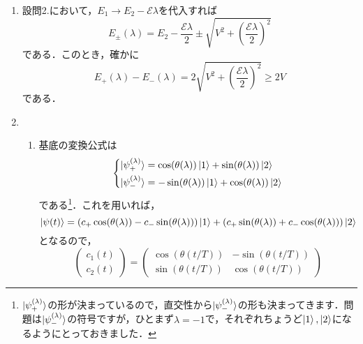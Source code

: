 \documentclass[a4paper,pdflatex,ja=standard]{bxjsarticle}
\begin{document}
\begin{enumerate}
  \item 
  設問2.において，$E_{1}\rightarrow E_{2}-\mathcal{E}\lambda$を代入すれば
  \begin{equation}
    E_{\pm}(\lambda)
    =
    E_{2}-\frac{\mathcal{E}\lambda}{2}
    \pm
    \sqrt{V^2+\left( \frac{\mathcal{E}\lambda}{2} \right)^2}
  \end{equation}
  である．このとき，確かに
  \begin{equation}
    E_{+}(\lambda)
    -
    E_{-}(\lambda)
    =
    2\sqrt{V^2+\left( \frac{\mathcal{E}\lambda}{2} \right)^2}
    \geq
    2V
  \end{equation}
  である．

  \item 
  \begin{enumerate}
    \item 
    基底の変換公式は
    \begin{equation}
      \left\{
        \begin{alignedat}{1}
          \ket{\psi_{+}^{(\lambda)}}
          &=
          \cos(\theta(\lambda))
          \ket{1}
          +
          \sin(\theta(\lambda))
          \ket{2}
          \\
          \ket{\psi_{-}^{(\lambda)}}
          &=
          -\sin(\theta(\lambda))
          \ket{1}
          +
          \cos(\theta(\lambda))
          \ket{2}
        \end{alignedat}
      \right.
    \end{equation}
    である\footnote{
      $\ket{\psi_{+}^{(\lambda)}}$の形が決まっているので，直交性から$\ket{\psi_{-}^{(\lambda)}}$の形も決まってきます．問題は$\ket{\psi_{-}^{(\lambda)}}$の符号ですが，ひとまず$\lambda=-1$で，それぞれちょうど$\ket{1},\ket{2}$になるようにとっておきました．
    }．これを用いれば，
    \begin{equation}
      \ket{\psi(t)}
      =
      (c_{+}\cos(\theta(\lambda))-c_{-}\sin(\theta(\lambda)))
      \ket{1}
      +
      (c_{+}\sin(\theta(\lambda))+c_{-}\cos(\theta(\lambda)))
      \ket{2}
    \end{equation}
    となるので，
    \begin{equation}
      \begin{pmatrix}
        c_{1}(t) \\
        c_{2}(t)
      \end{pmatrix}
      =
      \begin{pmatrix}
        \cos(\theta(t/T)) & -\sin(\theta(t/T)) \\
        \sin(\theta(t/T)) & \cos(\theta(t/T))

\end{pmatrix}
\end{equation}
\end{enumerate}
\end{enumerate}
\end{document}
